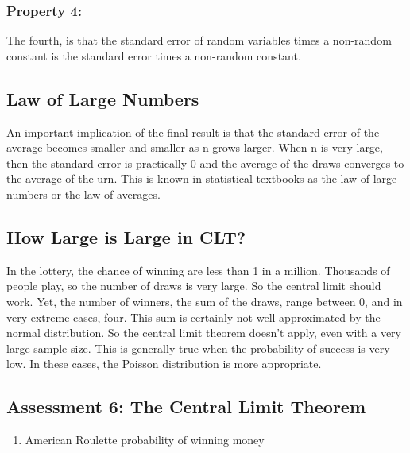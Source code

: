 \documentclass[
]{article}
\providecommand{\tightlist}{%
  \setlength{\itemsep}{0pt}\setlength{\parskip}{0pt}}
\begin{document}
\hypertarget{property-4}{%
\subsubsection{Property 4:}\label{property-4}}

The fourth, is that the standard error of random variables times a
non-random constant is the standard error times a non-random constant.

\hypertarget{law-of-large-numbers}{%
\subsection{Law of Large Numbers}\label{law-of-large-numbers}}

An important implication of the final result is that the standard error
of the average becomes smaller and smaller as n grows larger. When n is
very large, then the standard error is practically 0 and the average of
the draws converges to the average of the urn. This is known in
statistical textbooks as the law of large numbers or the law of
averages.

\hypertarget{how-large-is-large-in-clt}{%
\subsection{How Large is Large in
CLT?}\label{how-large-is-large-in-clt}}

In the lottery, the chance of winning are less than 1 in a million.
Thousands of people play, so the number of draws is very large. So the
central limit should work. Yet, the number of winners, the sum of the
draws, range between 0, and in very extreme cases, four. This sum is
certainly not well approximated by the normal distribution. So the
central limit theorem doesn't apply, even with a very large sample size.
This is generally true when the probability of success is very low. In
these cases, the Poisson distribution is more appropriate.

\hypertarget{assessment-6-the-central-limit-theorem}{%
\subsection{Assessment 6: The Central Limit
Theorem}\label{assessment-6-the-central-limit-theorem}}

\begin{enumerate}
\def\labelenumi{\arabic{enumi}.}
\tightlist
\item
  American Roulette probability of winning money
\end{enumerate}
\end{document}
